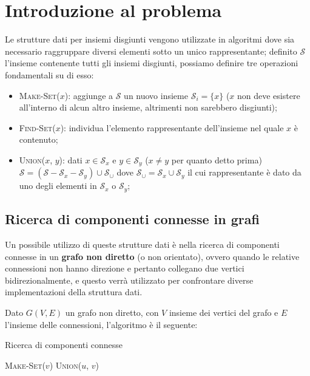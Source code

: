 \section{Introduzione al problema}

Le strutture dati per insiemi disgiunti vengono utilizzate in algoritmi
dove sia necessario raggruppare diversi elementi sotto un unico rappresentante;
definito $\mathcal{S}$ l'insieme contenente tutti gli insiemi disgiunti,
possiamo definire tre operazioni fondamentali su di esso:

\begin{itemize}
    \item \textsc{Make-Set($x$)}: aggiunge a $\mathcal{S}$ un nuovo insieme
          $\mathcal{S}_i = \{x\}$ ($x$ non deve esistere all'interno di alcun altro insieme,
          altrimenti non sarebbero disgiunti);
    \item \textsc{Find-Set($x$)}: individua l'elemento rappresentante dell'insieme nel quale $x$ è contenuto;
    \item \textsc{Union($x$, $y$)}: dati $x \in \mathcal{S}_x$ e $y \in \mathcal{S}_y$
          ($x \ne y$ per quanto detto prima) $\mathcal{S} = (\mathcal{S} - \mathcal{S}_x - \mathcal{S}_y) \cup \mathcal{S}_\cup$
          dove $\mathcal{S}_\cup = \mathcal{S}_x \cup \mathcal{S}_y$ il cui rappresentante è
          dato da uno degli elementi in $\mathcal{S}_x$ o $\mathcal{S}_y$;
\end{itemize}

\subsection{Ricerca di componenti connesse in grafi}

Un possibile utilizzo di queste strutture dati è nella ricerca di componenti
connesse in un \textbf{grafo non diretto} (o non orientato), ovvero quando le relative
connessioni non hanno direzione e pertanto collegano due vertici bidirezionalmente,
e questo verrà utilizzato per confrontare diverse implementazioni della
struttura dati.\newline

Dato $G(V,E)$ un grafo non diretto, con $V$ insieme dei vertici del grafo e $E$
l'insieme delle connessioni, l'algoritmo è il seguente:

\begin{algorithm}
    \caption{Ricerca di componenti connesse}\label{connectedComponentsAlg}
    \begin{algorithmic}[1]
         \label{alg:firstfor}
        \STATE \textsc{Make-Set($v$)}
        \ENDFOR
         \label{alg:secondfor}
        \STATE \textsc{Union($u$, $v$)}
        \ENDIF
        \ENDFOR
    \end{algorithmic}
\end{algorithm}

